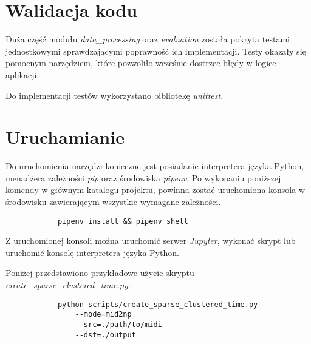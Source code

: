 {{    }

    \section{Walidacja kodu}
    {
        Duża część modułu {\textit {data\_processing}} oraz {\textit {evaluation}} została pokryta testami jednostkowymi sprawdzającymi poprawność ich implementacji. 
        Testy okazały się pomocnym narzędziem, które pozwoliło wcześnie dostrzec błędy w logice aplikacji.

        Do implementacji testów wykorzystano bibliotekę {\textit {unittest}}.
    }

    \section{Uruchamianie}
    {
        Do uruchomienia narzędzi konieczne jest posiadanie interpretera języka Python, menadżera zależności {\textit {pip}} oraz środowiska {\textit {pipenv}}. Po wykonaniu poniższej komendy w głównym katalogu projektu, powinna zostać uruchomiona konsola w środowisku zawierającym wszystkie wymagane zależności.

        \begin{verbatim}
            pipenv install && pipenv shell
        \end{verbatim}

        Z uruchomionej konsoli można uruchomić serwer {\textit {Jupyter}}, wykonać skrypt lub uruchomić konsolę interpretera języka Python.


        Poniżej przedstawiono przykładowe użycie skryptu \\{\textit {create\_sparse\_clustered\_time.py}}:
        \begin{verbatim}
            python scripts/create_sparse_clustered_time.py 
                --mode=mid2np 
                --src=./path/to/midi 
                --dst=./output
        \end{verbatim}
    }
}